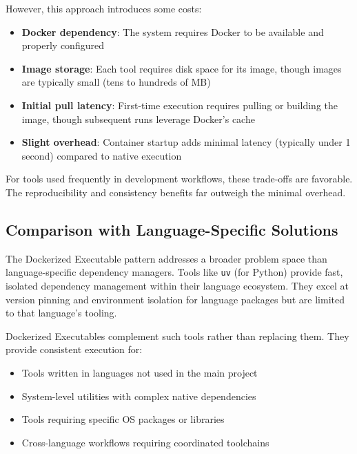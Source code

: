 However, this approach introduces some costs:

\begin{itemize}
  \item \textbf{Docker dependency}: The system requires Docker to be available
    and properly configured

  \item \textbf{Image storage}: Each tool requires disk space for its image,
    though images are typically small (tens to hundreds of MB)

  \item \textbf{Initial pull latency}: First-time execution requires pulling
    or building the image, though subsequent runs leverage Docker's
    cache

  \item \textbf{Slight overhead}: Container startup adds minimal latency
    (typically under 1 second) compared to native execution
\end{itemize}

For tools used frequently in development workflows, these trade-offs are
favorable. The reproducibility and consistency benefits far outweigh
the minimal overhead.

\subsection{Comparison with Language-Specific Solutions}

The Dockerized Executable pattern addresses a broader problem space than
language-specific dependency managers. Tools like \texttt{uv} (for
Python) provide fast, isolated dependency management within their
language ecosystem. They excel at version pinning and environment isolation
for language packages but are limited to that language's tooling.

Dockerized Executables complement such tools rather than replacing them.
They provide consistent execution for:

\begin{itemize}
  \item Tools written in languages not used in the main project

  \item System-level utilities with complex native dependencies

  \item Tools requiring specific OS packages or libraries

  \item Cross-language workflows requiring coordinated toolchains
\end{itemize}

